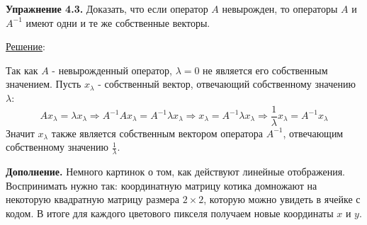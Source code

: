 \documentclass[a4paper, 12pt]{article}
\begin{document}
\begin{spacing}{1.5}
\textbf{Упражнение 4.3.} Доказать, что если оператор $A$ невырожден, то операторы $A$ и $A^{-1}$ имеют одни и те же собственные векторы.

\underline{Решение}:

\setlength{\leftskip}{5ex}
\setlength{\rightskip}{5ex}

Так как $A$ - невырожденный оператор, $\lambda = 0$ не является его собственным значением. Пусть $x_{\lambda}$ - собственный вектор, отвечающий собственному значению $\lambda$:
$$A x_{\lambda} = \lambda x_{\lambda} \Rightarrow A^{-1} A x_{\lambda} = A^{-1} \lambda x_{\lambda} \Rightarrow x_{\lambda} = A^{-1} \lambda x_{\lambda} \Rightarrow \frac{1}{\lambda} x_{\lambda} = A^{-1} x_{\lambda}$$
Значит $x_{\lambda}$ также является собственным вектором оператора $A^{-1}$, отвечающим собственному значению $\frac{1}{\lambda}$.

\setlength{\leftskip}{0ex}
\setlength{\rightskip}{0ex}

\textbf{Дополнение.} Немного картинок о том, как действуют линейные отображения. Воспринимать нужно так: координатную матрицу котика домножают на некоторую квадратную матрицу размера $2 \times 2$, которую можно увидеть в ячейке с кодом. В итоге для каждого цветового пикселя получаем новые координаты $x$ и $y$.


\end{spacing}
\end{document}
